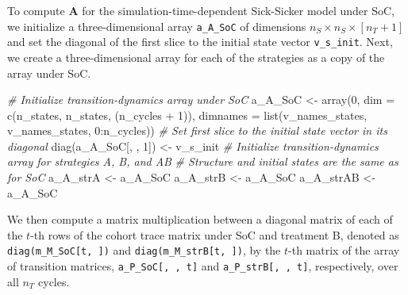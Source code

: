 \documentclass[
]{article}
\newenvironment{Shaded}{\begin{snugshade}}{\end{snugshade}}
\newcommand{\AttributeTok}[1]{\textcolor[rgb]{0.77,0.63,0.00}{#1}}
\newcommand{\CommentTok}[1]{\textcolor[rgb]{0.56,0.35,0.01}{\textit{#1}}}
\newcommand{\DecValTok}[1]{\textcolor[rgb]{0.00,0.00,0.81}{#1}}
\newcommand{\FunctionTok}[1]{\textcolor[rgb]{0.00,0.00,0.00}{#1}}
\newcommand{\NormalTok}[1]{#1}
\newcommand{\OtherTok}[1]{\textcolor[rgb]{0.56,0.35,0.01}{#1}}
\newcommand{\SpecialCharTok}[1]{\textcolor[rgb]{0.00,0.00,0.00}{#1}}
\begin{document}
To compute \(\mathbf{A}\) for the simulation-time-dependent Sick-Sicker model under SoC, we initialize a three-dimensional array \texttt{a\_A\_SoC} of dimensions \(n_S \times n_S \times [n_T+1]\) and set the diagonal of the first slice to the initial state vector \texttt{v\_s\_init}. Next, we create a three-dimensional array for each of the strategies as a copy of the array under SoC.

\begin{Shaded}
\begin{Highlighting}[]
\CommentTok{\# Initialize transition{-}dynamics array under SoC}
\NormalTok{a\_A\_SoC }\OtherTok{\textless{}{-}} \FunctionTok{array}\NormalTok{(}\DecValTok{0}\NormalTok{,}
             \AttributeTok{dim =} \FunctionTok{c}\NormalTok{(n\_states, n\_states, (n\_cycles }\SpecialCharTok{+} \DecValTok{1}\NormalTok{)),}
             \AttributeTok{dimnames =} \FunctionTok{list}\NormalTok{(v\_names\_states, v\_names\_states, }\DecValTok{0}\SpecialCharTok{:}\NormalTok{n\_cycles))}
\CommentTok{\# Set first slice to the initial state vector in its diagonal}
\FunctionTok{diag}\NormalTok{(a\_A\_SoC[, , }\DecValTok{1}\NormalTok{]) }\OtherTok{\textless{}{-}}\NormalTok{ v\_s\_init}
\CommentTok{\# Initialize transition{-}dynamics array for strategies A, B, and AB}
\CommentTok{\# Structure and initial states are the same as for SoC}
\NormalTok{a\_A\_strA  }\OtherTok{\textless{}{-}}\NormalTok{ a\_A\_SoC}
\NormalTok{a\_A\_strB  }\OtherTok{\textless{}{-}}\NormalTok{ a\_A\_SoC}
\NormalTok{a\_A\_strAB }\OtherTok{\textless{}{-}}\NormalTok{ a\_A\_SoC}
\end{Highlighting}
\end{Shaded}

We then compute a matrix multiplication between a diagonal matrix of each of the \(t\)-th rows of the cohort trace matrix under SoC and treatment B, denoted as \texttt{diag(m\_M\_SoC{[}t,\ {]})} and \texttt{diag(m\_M\_strB{[}t,\ {]})}, by the \(t\)-th matrix of the array of transition matrices, \texttt{a\_P\_SoC{[},\ ,\ t{]}} and \texttt{a\_P\_strB{[},\ ,\ t{]}}, respectively, over all \(n_T\) cycles.
\end{document}
